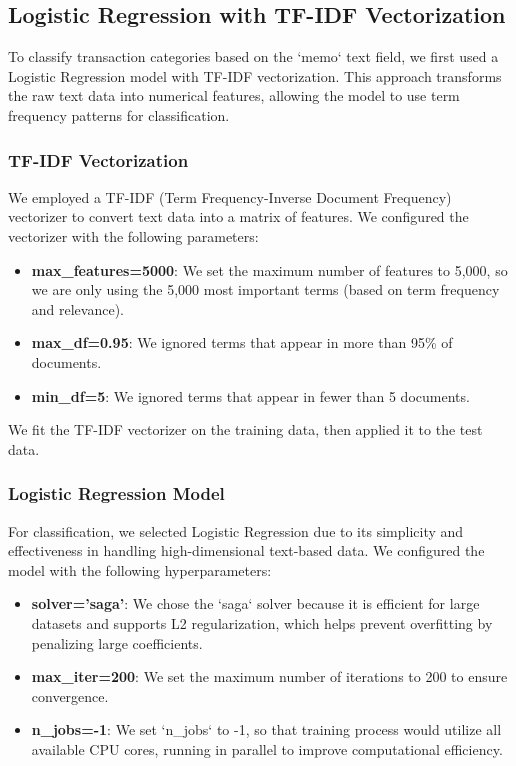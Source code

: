 \documentclass[12pt,letterpaper]{article}
\begin{document}
\subsection{Logistic Regression with TF-IDF Vectorization}

To classify transaction categories based on the `memo` text field, we first used a Logistic Regression model with TF-IDF vectorization. This approach transforms the raw text data into numerical features, allowing the model to use term frequency patterns for classification.

\subsubsection{TF-IDF Vectorization}
We employed a TF-IDF (Term Frequency-Inverse Document Frequency) vectorizer to convert text data into a matrix of features. We configured the vectorizer with the following parameters:
\begin{itemize}
    \item \textbf{max\_features=5000}: We set the maximum number of features to 5,000, so we are only using the 5,000 most important terms (based on term frequency and relevance).
    \item \textbf{max\_df=0.95}: We ignored terms that appear in more than 95\% of documents.
    \item \textbf{min\_df=5}: We ignored terms that appear in fewer than 5 documents.
\end{itemize}

We fit the TF-IDF vectorizer on the training data, then applied it to the test data.

\subsubsection{Logistic Regression Model}
For classification, we selected Logistic Regression due to its simplicity and effectiveness in handling high-dimensional text-based data. We configured the model with the following hyperparameters:
\begin{itemize}
    \item \textbf{solver='saga'}: We chose the `saga` solver because it is efficient for large datasets and supports L2 regularization, which helps prevent overfitting by penalizing large coefficients.
    \item \textbf{max\_iter=200}: We set the maximum number of iterations to 200 to ensure convergence.
    \item \textbf{n\_jobs=-1}: We set `n\_jobs` to -1, so that training process would utilize all available CPU cores, running in parallel to improve computational efficiency.
\end{itemize}
\end{document}
